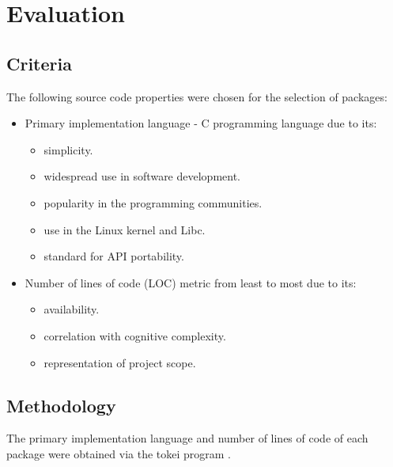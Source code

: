 \section{Evaluation}\label{Evaluation}

\subsection{Criteria}

The following source code properties were chosen for the selection of packages:

\begin{itemize}
    \item Primary implementation language - C programming language due to its:
    \begin{itemize}
        \item simplicity.
        \item widespread use in software development.
        \item popularity in the programming communities.
        \item use in the Linux kernel and Libc.
        \item standard for API portability.
    \end{itemize}
    \item Number of lines of code (LOC) metric from least to most due to its:
    \begin{itemize}
        \item availability.
        \item correlation with cognitive complexity.
        \item representation of project scope.
    \end{itemize}
\end{itemize}

\subsection{Methodology}

The primary implementation language and number of lines of code of each package were obtained via the tokei program \cite{tokei}.
